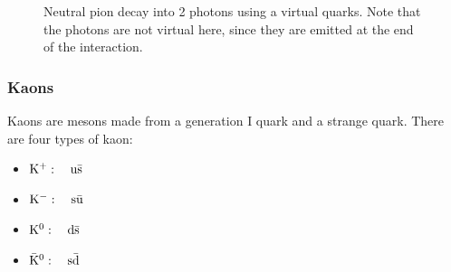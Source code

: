             \begin{figure} \label{fig:neutral_pion_decay}
                \begin{center}
                \end{center}
                \caption{Neutral pion decay into 2 photons using a virtual quarks. Note that the photons are not virtual here, since they are emitted at the end of the interaction.}
            \end{figure}


        \subsubsection{Kaons}
            Kaons are mesons made from a generation I quark and a strange quark.
            There are four types of kaon:
            \begin{itemize}
                \item $\kaon[+]:\quad\mesonquarks[u][s]$
                \item $\kaon[-]:\quad\mesonquarks[s][u]$
                \item $\kaon[0]:\quad\mesonquarks[d][s]$
                \item $\antikaon[0]:\quad\mesonquarks[s][d]$
            \end{itemize}


